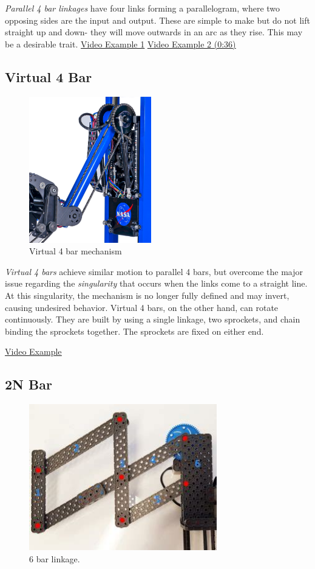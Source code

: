 \documentclass[10pt,letterpaper]{book}
\begin{document}
\textit{Parallel 4 bar linkages} have four links forming a parallelogram, where two opposing sides are the input and output. These are simple to make but do not lift straight up and down- they will move outwards in an arc as they rise. This may be a desirable trait. \href{https://www.youtube.com/watch?v=hnxqZlG-508}{\color{red}\underline{Video Example 1}} \href{https://youtu.be/LaV0zbKz-Qg?t=36}{\color{red}\underline{Video Example 2 (0:36)}}
\subsection{Virtual 4 Bar}

\begin{figure}[H]
	\includegraphics[height=2.5in]{imgs/virtual_4bar_1.png}
	\caption{Virtual 4 bar mechanism}
\end{figure}

\textit{Virtual 4 bars} achieve similar motion to parallel 4 bars, but overcome the major issue regarding the \textit{singularity} that occurs when the links come to a straight line. At this singularity, the mechanism is no longer fully defined and may invert, causing undesired behavior. Virtual 4 bars, on the other hand, can rotate continuously. They are built by using a single linkage, two sprockets, and chain binding the sprockets together. The sprockets are fixed on either end.

\href{https://www.youtube.com/watch?v=nH6P4BcwtiE}{\color{red}\underline{Video Example}}

\subsection{2N Bar}

\begin{figure}[H]
	\includegraphics[height=2.5in]{imgs/6bar.jpeg}
	\caption{6 bar linkage.}
\end{figure}
\end{document}
